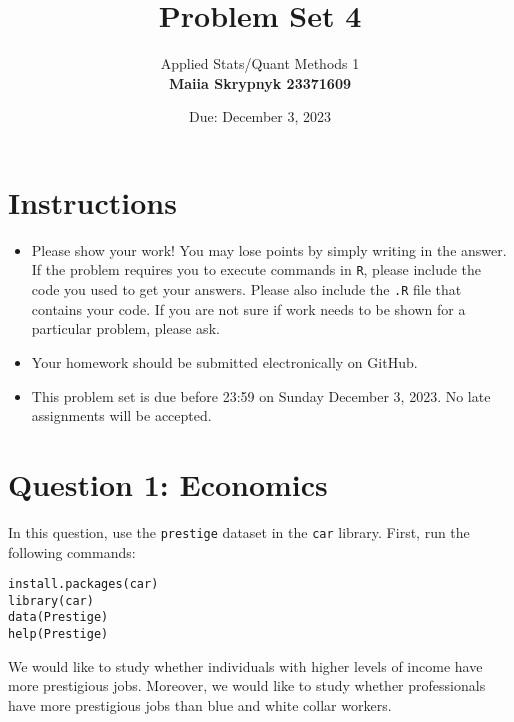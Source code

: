 \documentclass[12pt,letterpaper]{article}
\title{Problem Set 4}
\date{Due: December 3, 2023}
\author{Applied Stats/Quant Methods 1 \\ \vspace{\baselineskip}
	\textbf{Maiia Skrypnyk 23371609}}
\begin{document}
	\maketitle
	\section*{Instructions}
	\begin{itemize}
		\item Please show your work! You may lose points by simply writing in the answer. If the problem requires you to execute commands in \texttt{R}, please include the code you used to get your answers. Please also include the \texttt{.R} file that contains your code. If you are not sure if work needs to be shown for a particular problem, please ask.
		\item Your homework should be submitted electronically on GitHub.
		\item This problem set is due before 23:59 on Sunday December 3, 2023. No late assignments will be accepted.
	\end{itemize}



	\vspace{.5cm}
\section*{Question 1: Economics}
\vspace{.25cm}
\noindent 	
In this question, use the \texttt{prestige} dataset in the \texttt{car} library. First, run the following commands:

\begin{verbatim}
install.packages(car)
library(car)
data(Prestige)
help(Prestige)
\end{verbatim} 


\noindent We would like to study whether individuals with higher levels of income have more prestigious jobs. Moreover, we would like to study whether professionals have more prestigious jobs than blue and white collar workers.
\end{document}

